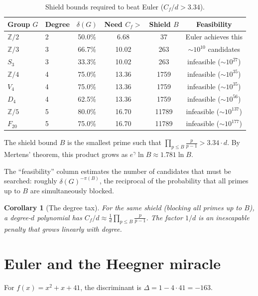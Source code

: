 \documentclass[11pt,a4paper]{article}
\newtheorem{corollary}[theorem]{Corollary}
\theoremstyle{definition}
\theoremstyle{remark}
\newcommand{\Z}{\mathbb{Z}}
\begin{document}
\begin{table}[ht]
\centering
\caption{Shield bounds required to beat Euler ($C_f/d > 3.34$).}
\label{tab:shield}
\medskip
\begin{tabular}{llcccc}
\toprule
Group $G$ & Degree & $\delta(G)$ & Need $C_f >$ & Shield $B$ & Feasibility \\
\midrule
$\Z/2$ & 2 & 50.0\% & 6.68 & 37 & Euler achieves this \\
$\Z/3$ & 3 & 66.7\% & 10.02 & 263 & $\sim\!10^{10}$ candidates \\
$S_3$  & 3 & 33.3\% & 10.02 & 263 & infeasible ($\sim\!10^{27}$) \\
$\Z/4$ & 4 & 75.0\% & 13.36 & 1759 & infeasible ($\sim\!10^{35}$) \\
$V_4$  & 4 & 75.0\% & 13.36 & 1759 & infeasible ($\sim\!10^{35}$) \\
$D_4$  & 4 & 62.5\% & 13.36 & 1759 & infeasible ($\sim\!10^{56}$) \\
$\Z/5$ & 5 & 80.0\% & 16.70 & 11789 & infeasible ($\sim\!10^{137}$) \\
$F_{20}$ & 5 & 75.0\% & 16.70 & 11789 & infeasible ($\sim\!10^{177}$) \\
\bottomrule
\end{tabular}
\end{table}

The shield bound $B$ is the smallest prime such that $\prod_{p \leq B} \frac{p}{p-1} > 3.34 \cdot d$.
By Mertens' theorem, this product grows as $e^\gamma \ln B \approx 1.781 \ln B$.

The ``feasibility'' column estimates the number of candidates that must be searched: roughly $\delta(G)^{-\pi(B)}$, the reciprocal of the probability that all primes up to $B$ are simultaneously blocked.

\begin{corollary}[The degree tax]
For the same shield (blocking all primes up to $B$), a degree-$d$ polynomial has $C_f/d \approx \frac{1}{d}\prod_{p \leq B}\frac{p}{p-1}$.
The factor $1/d$ is an inescapable penalty that grows linearly with degree.
\end{corollary}


\section{Euler and the Heegner miracle}\label{sec:euler}

For $f(x) = x^2 + x + 41$, the discriminant is $\Delta = 1 - 4 \cdot 41 = -163$.
\end{document}
